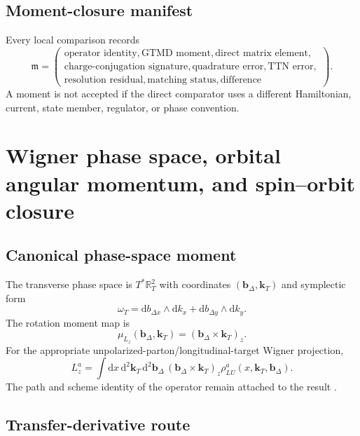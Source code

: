 \documentclass[11pt]{article}
\newcommand{\kT}{\bm{k}_{T}}
\newcommand{\bD}{\bm{b}_{\Delta}}
\newcommand{\dd}{\mathrm{d}}
\begin{document}
\subsection{Moment-closure manifest}

Every local comparison records
\begin{equation}
 \mathfrak m=
 \left(
 \begin{array}{l}
 \text{operator identity},\text{GTMD moment},
 \text{direct matrix element},\\
 \text{charge-conjugation signature},
 \text{quadrature error},\text{TTN error},\\
 \text{resolution residual},
 \text{matching status},
 \text{difference}
 \end{array}
 \right).
 \label{eq:moment-manifest}
\end{equation}
A moment is not accepted if the direct comparator uses a different Hamiltonian,
current, state member, regulator, or phase convention.

\section{Wigner phase space, orbital angular momentum, and spin--orbit closure}
\label{sec:wigner-oam}

\subsection{Canonical phase-space moment}

The transverse phase space is \(T^*\mathbb R_T^2\) with coordinates
\((\bD,\kT)\) and symplectic form
\begin{equation}
 \omega_T
 =\dd b_{\Delta x}\wedge\dd k_x
 +\dd b_{\Delta y}\wedge\dd k_y.
 \label{eq:h4-symplectic-form}
\end{equation}
The rotation moment map is
\begin{equation}
 \mu_{L_z}(\bD,\kT)
 =(\bD\times\kT)_z.
 \label{eq:h4-moment-map}
\end{equation}
For the appropriate unpolarized-parton/longitudinal-target Wigner projection,
\begin{equation}
 L_z^a
 =\int\dd x\,\dd^2\kT\,\dd^2\bD\,
 (\bD\times\kT)_z
 \rho_{LU}^a(x,\kT,\bD).
 \label{eq:wigner-oam}
\end{equation}
The path and scheme identity of the operator remain attached to the result
\cite{Lorce2011}.

\subsection{Transfer-derivative route}
\end{document}
